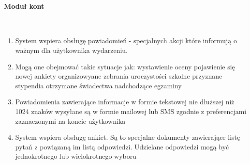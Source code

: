 \documentclass{article}
\begin{document}
\paragraph{Moduł kont} \mbox{}\\
\begin{enumerate}
	\item System wspiera obsługę powiadomień - specjalnych akcji które informują o ważnym dla użytkownika wydarzeniu. \item Mogą one obejmować takie sytuacje jak:
	\subitem wystawienie oceny
	\subitem pojawienie się nowej ankiety
	\subitem organizowyane zebrania
	\subitem uroczystości szkolne
	\subitem przyznane stypendia
	\subitem otrzymane świadectwa
	\subitem nadchodzące egzaminy
	\item Powiadomienia zawierające informacje w formie tekstowej nie dłuższej niż 1024 znaków wysyłane są w formie mailowej lub SMS zgodnie z preferencjami zaznaczonymi na koncie użytkownika
	\item System wspiera obsługę ankiet. Są to specjalne dokumenty zawierające listę pytań z powiązaną im listą odpowiedzi. Udzielane odpowiedzi mogą być jednokrotnego lub wielokrotnego wyboru

\end{enumerate}
\end{document}
